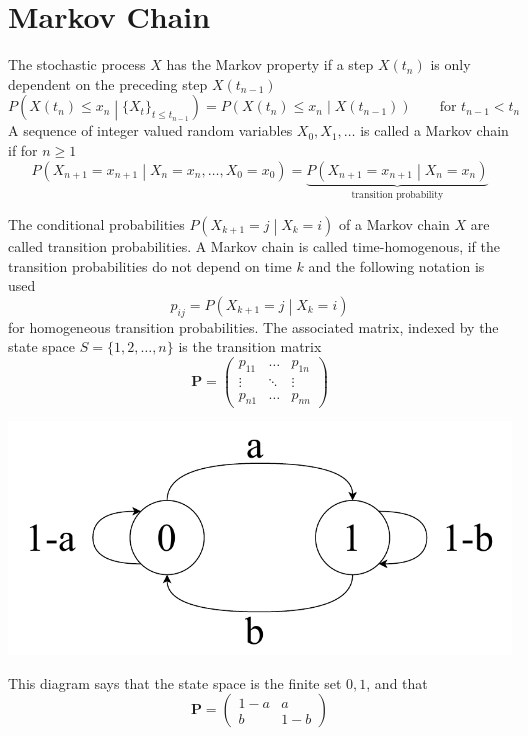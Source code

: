 \documentclass[11pt]{article}
\theoremstyle{definition}
\begin{document}
\section{Markov Chain}
The stochastic process $X$ has the Markov property if a step $X(t_n)$ is only dependent on the preceding step $X(t_{n-1})$
\begin{equation*}
	P\left(X(t_n)\leq x_n \middle| \{X_t\}_{t\leq t_{n-1}} \right) = P\left(X(t_n)\leq x_n \middle| X(t_{n-1}) \right)\qquad\text{for }t_{n-1}<t_n
\end{equation*}
A sequence of integer valued random variables $X_0, X_1,\dots$ is called a Markov chain if for $n \geq 1$
\begin{equation*}
	P\left( X_{n+1}=x_{n+1} \middle| X_{n}=x_{n},\dots,X_{0}=x_{0} \right) = \underbrace{P\left( X_{n+1}=x_{n+1} \middle| X_{n}=x_{n} \right)}_{\text{transition probability}}
\end{equation*}

The conditional probabilities $P\left(X_{k+1}=j \middle| X_k = i\right)$ of a Markov chain $X$ are called transition probabilities. A Markov chain is called time-homogenous, if the transition probabilities do not depend on time $k$ and the following notation is used
\begin{equation*}
	p_{ij} = P\left(X_{k+1}=j\middle| X_k = i\right)
\end{equation*}
for homogeneous transition probabilities. The associated matrix, indexed by the state space $S = \{1,2,\dots,n\}$ is the transition matrix
\begin{equation*}
	\bm{P} = \begin{pmatrix}
	p_{11} & \dots & p_{1n}\\
	\vdots & \ddots & \vdots \\
	p_{n1} & \dots & p_{nn}
	\end{pmatrix}
\end{equation*}
\begin{center}
	\includegraphics[width=0.6\linewidth]{img/discrete_markov_chain}
\end{center}
This diagram says that the state space is the finite set ${0,1}$, and that
\begin{equation*}
	\bm{P} = \begin{pmatrix}
	1-a & a\\
	b & 1-b
	\end{pmatrix}
\end{equation*}
\end{document}
